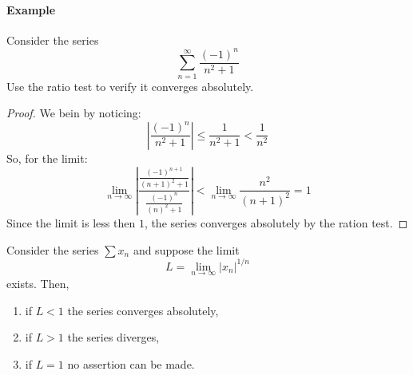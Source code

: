 \paragraph{Example} Consider the series
\begin{equation*}
    \sum \limits_{n=1}^\infty \frac{(-1)^n}{n^2+1}
\end{equation*}
Use the ratio test to verify it converges absolutely.

\begin{proof}
    We bein by noticing:
    \begin{equation*}
        \left |
            \frac{(-1)^n}{n^2+1}
        \right | \leq
        \frac{1}{n^2+1} <
        \frac{1}{n^2}
    \end{equation*}
    So, for the limit:
    \begin{equation*}
        \lim \limits_{n \to \infty} \left |
            \frac{
                \frac{(-1)^{n+1}}{(n+1)^2+1}
            }{
                \frac{(-1)^{n}}{(n)^2+1}
            }
        \right | <
        \lim \limits_{n \to \infty} \frac{n^2}{(n+1)^2} = 1
    \end{equation*}
    Since the limit is less then $1$, the series converges absolutely by the ration test.
\end{proof}

\begin{theorem}
    Consider the series $\sum x_n$ and suppose the limit
    \begin{equation*}
        L = \lim \limits_{n\to \infty} |x_n|^{1/n}
    \end{equation*}
    exists. Then,
    \begin{enumerate}
        \item if $L < 1$ the series converges absolutely,
        \item if $L > 1$ the series diverges,
        \item if $L = 1$ no assertion can be made.
    \end{enumerate}
\end{theorem}

